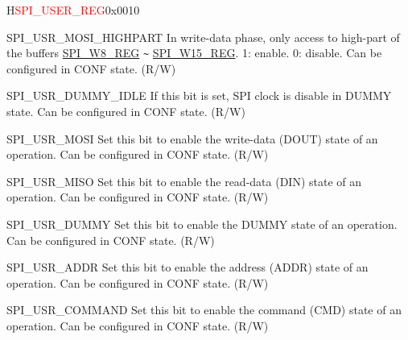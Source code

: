 \begin{register}{H}{\textcolor{red}{SPI\_USER\_REG}}{0x{}0010}
\begin{regdesc}
\begin{reglist}
\label{fielddesc:SPIUSRMOSIHIGHPART}\item [SPI\_USR\_MOSI\_HIGHPART] In write-data phase, only access to high-part of the buffers \hyperref[regdesc:SPIW8REG]{SPI\_W8\_REG} \verb+~+ \hyperref[regdesc:SPIW15REG]{SPI\_W15\_REG}. 1: enable. 0: disable. Can be configured in CONF state. (R/W)
\label{fielddesc:SPIUSRDUMMYIDLE}\item [SPI\_USR\_DUMMY\_IDLE] If this bit is set, SPI clock is disable in DUMMY state. Can be configured in CONF state. (R/W)
\label{fielddesc:SPIUSRMOSI}\item [SPI\_USR\_MOSI] Set this bit to enable the write-data (DOUT) state of an operation. Can be configured in CONF state. (R/W)
\label{fielddesc:SPIUSRMISO}\item [SPI\_USR\_MISO] Set this bit to enable the read-data (DIN) state of an operation. Can be configured in CONF state. (R/W)
\label{fielddesc:SPIUSRDUMMY}\item [SPI\_USR\_DUMMY] Set this bit to enable the DUMMY state of an operation. Can be configured in CONF state. (R/W)
\label{fielddesc:SPIUSRADDR}\item [SPI\_USR\_ADDR] Set this bit to enable the address (ADDR) state of an operation. Can be configured in CONF state. (R/W)
\label{fielddesc:SPIUSRCOMMAND}\item [SPI\_USR\_COMMAND] Set this bit to enable the command (CMD) state of an operation. Can be configured in CONF state. (R/W)
\end{reglist}\end{regdesc}
\end{register}


